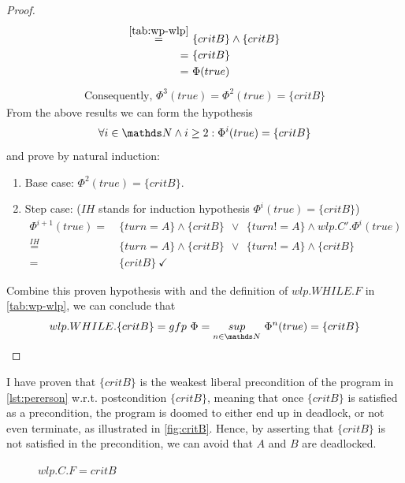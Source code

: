 \begin{proof}
\begin{align*}
		\overset{\autoref{tab:wp-wlp}}{=}&\ \{critB\}\wedge\{critB\}\\
		=&\ \{critB\}\\
		=&\ \Phi(true)\\
	\end{align*}
	\vspace{-15mm}
	\begin{align*}
		\text{Consequently, } \Phi^3(true) = \Phi^2(true) = \{critB\}
	\end{align*}
	From the above results we can form the hypothesis
	$$\forall i\in\N\wedge i\geq 2: \Phi^i(true)=\{critB\}$$
	and prove by natural induction: 
	\begin{enumerate}
		\item Base case: $\Phi^2(true) = \{critB\}$. \checkmark
		\item Step case: ($IH$ stands for induction hypothesis $\Phi^i(true)=\{critB\}$)
		\begin{align*}
			\Phi^{i+1}(true) =&\ \{turn=A\}\wedge \{critB\}\ \ \vee\ \ \{turn!=A\} \wedge wlp.C'.\Phi^i(true) \\ 
			\overset{IH}{=}&\ \{turn=A\}\wedge \{critB\}\ \ \vee\ \ \{turn!=A\} \wedge \{critB\} \\
			=&\ \{critB\}\ \checkmark
		\end{align*} 
	\end{enumerate}
	Combine this proven hypothesis with  and the definition of $wlp.WHILE.F$ in \autoref{tab:wp-wlp}, we can conclude that 
	$$wlp.WHILE.\{critB\}=gfp\ \Phi = \underset{n\in\N}{sup}\ \Phi^n(true) = \{critB\}$$
\end{proof}

I have proven that $\{critB\}$ is the weakest liberal precondition of the program in \autoref{lst:pererson} w.r.t. postcondition $\{critB\}$, meaning that once $\{critB\}$ is satisfied as a precondition, the program is doomed to either end up in deadlock, or not even terminate, as illustrated in \autoref{fig:critB}. 
Hence, by asserting that $\{critB\}$ is not satisfied in the precondition, we can avoid that $A$ and $B$ are deadlocked. 
\begin{figure}[ht]
	\centering
	
	\caption{$wlp.C.F = critB$}
	\label{fig:critB}
\end{figure}

